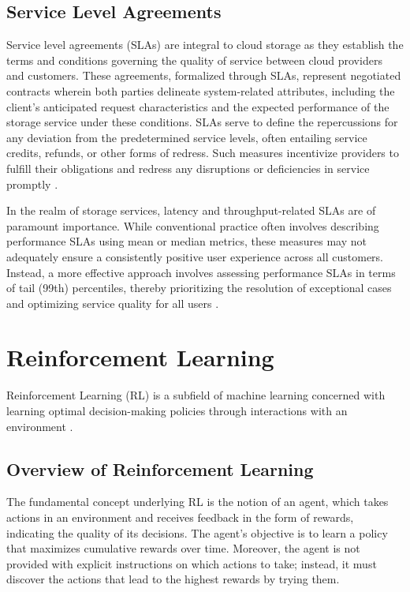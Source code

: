 \subsection{Service Level Agreements}
Service level agreements (SLAs) are integral to cloud storage as they establish the terms and conditions governing the quality of service between cloud providers and customers. These agreements, formalized through SLAs, represent negotiated contracts wherein both parties delineate system-related attributes, including the client's anticipated request characteristics and the expected performance of the storage service under these conditions. SLAs serve to define the repercussions for any deviation from the predetermined service levels, often entailing service credits, refunds, or other forms of redress. Such measures incentivize providers to fulfill their obligations and redress any disruptions or deficiencies in service promptly \cite{DeCandia2007,180275,tariq2020sequoia}.

In the realm of storage services, latency and throughput-related SLAs are of paramount importance. While conventional practice often involves describing performance SLAs using mean or median metrics, these measures may not adequately ensure a consistently positive user experience across all customers. Instead, a more effective approach involves assessing performance SLAs in terms of tail (99th) percentiles, thereby prioritizing the resolution of exceptional cases and optimizing service quality for all users \cite{DeCandia2007}.

\section{Reinforcement Learning}

Reinforcement Learning (RL) is a subfield of machine learning concerned with learning optimal decision-making policies through interactions with an environment \cite{sutton2018reinforcement}. 

\subsection{Overview of Reinforcement Learning}
The fundamental concept underlying RL is the notion of an agent, which takes actions in an environment and receives feedback in the form of rewards, indicating the quality of its decisions. The agent's objective is to learn a policy that maximizes cumulative rewards over time. Moreover, the agent is not provided with explicit instructions on which actions to take; instead, it must discover the actions that lead to the highest rewards by trying them.

